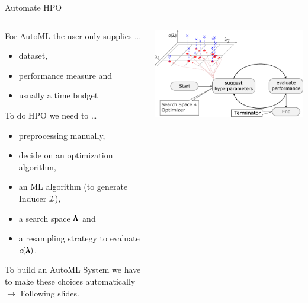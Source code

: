 \begin{frame}{Automate HPO}

  \begin{columns}
    \begin{column}{0.59\textwidth}

      For AutoML the user only supplies \ldots
      \begin{itemize}
        \item dataset,
        \item performance measure and
        \item usually a time budget
      \end{itemize}

      To do HPO we need to \ldots
      \begin{itemize}
        \item preprocessing manually,
        \item decide on an optimization algorithm,
        \item an ML algorithm (to generate Inducer $\mathcal{I}$),
        \item a search space $\pmb{\Lambda}$ and
        \item a resampling strategy to evaluate $c(\pmb{\lambda})$.
      \end{itemize}

      To build an AutoML System we have to make these choices automatically $\rightarrow$ Following slides.

    \end{column}%
    \begin{column}{0.4\textwidth}
      \begin{center}
        \includegraphics[width = \linewidth]{images/tuning.pdf}    
      \end{center}
    \end{column}
  \end{columns}

\end{frame}

